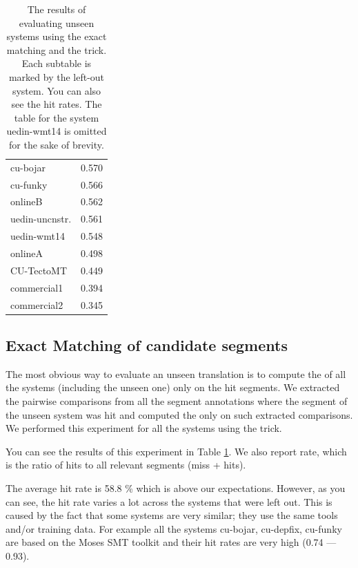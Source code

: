 \begin{table}
{\begin{tabular}{|l|c|}
           cu-bojar            &   0.570 \\
           cu-funky            &   0.566 \\
           onlineB                &   0.562 \\
           uedin-uncnstr. &   0.561 \\
           uedin-wmt14         &   0.548 \\
           onlineA                &   0.498 \\
           CU-TectoMT          &   0.449 \\
           commercial1         &   0.394 \\
           commercial2         &   0.345 \\
          \hline
         \end{tabular}
      \label{}
    }

    \caption[Results of evaluating unseen systems by exact matching]{The
      results of evaluating unseen systems using the exact matching and the
       trick. Each subtable is marked by the left-out
      system.  You can also see the hit rates. The table for the system uedin-wmt14
      is omitted for the sake of brevity.}

  \label{one-out-results}
\end{table}

\subsection{Exact Matching of candidate segments}
\label{exact:matching}

The most obvious way to evaluate an unseen translation is to compute the
 of all the systems (including the unseen
one) only on the hit segments. We extracted the pairwise comparisons from all
the segment annotations where the segment of the unseen system was hit and
computed the  only on such extracted
comparisons. We performed this experiment for all the systems using the
 trick.

You can see the results of this experiment in Table \ref{one-out-results}.
We also report  rate, which is the ratio of hits to all relevant
segments (miss + hits).

The average hit rate is 58.8 \% which is above our expectations. However, as you
can see, the hit rate varies a lot across the systems that were left out. This is
caused by the fact that some systems are very similar; they use the same tools
and/or training data. For example all the systems cu-bojar, cu-depfix, cu-funky
are based on the Moses SMT toolkit and their hit rates are very high (0.74 ---
0.93).

